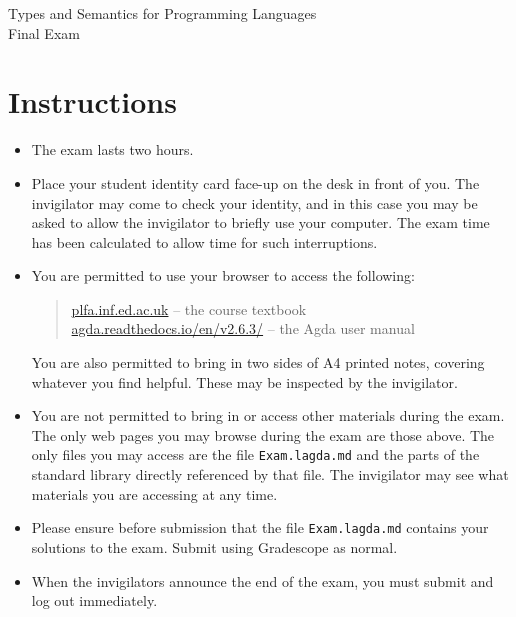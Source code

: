 \documentclass[12pt]{article}
\begin{document}
\pagestyle{empty}
\setcounter{page}{1}

\begin{center}
\Large Types and Semantics for Programming Languages \\
\LARGE Final Exam
\end{center}

\section*{Instructions}

\begin{itemize}

\item
  The exam lasts two hours.

\item
  Place your student identity card face-up on the desk in front of you.  The
  invigilator may come to check your identity, and in this case you may be asked
  to allow the invigilator to briefly use your computer.  The exam time has been
  calculated to allow time for such interruptions.

\item
  You are permitted to use your browser to access the following:
  \begin{quote}
    \url{plfa.inf.ed.ac.uk} -- the course textbook \\
    \url{agda.readthedocs.io/en/v2.6.3/} -- the Agda user manual
  \end{quote}
  You are also permitted to bring in two sides of A4 printed notes,
  covering whatever you find helpful. These may be inspected by the
  invigilator.

\item
  You are not permitted to bring in or access other materials during
  the exam. The only web pages you may browse during the exam are
  those above. The only files you may access are the file \texttt{Exam.lagda.md}
  and the parts of the standard library directly referenced by
  that file. The invigilator may see what materials you are accessing
  at any time.

\item
  Please ensure before submission that the file
  \texttt{Exam.lagda.md} contains your solutions to the exam.
  Submit using Gradescope as normal.

\item
  When the invigilators announce the end of the exam, you must
  submit and log out immediately.

\end{itemize}
\end{document}
